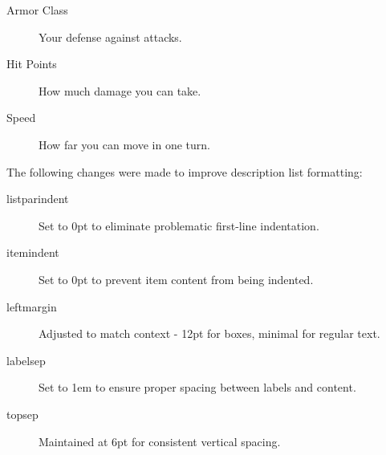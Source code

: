 \documentclass[letterpaper,twocolumn]{dndbook}
\begin{document}
\begin{description}
  \item[Armor Class] Your defense against attacks.
  \item[Hit Points] How much damage you can take.
  \item[Speed] How far you can move in one turn.
\end{description}

The following changes were made to improve description list formatting:

\begin{description}
  \item[listparindent] Set to 0pt to eliminate problematic first-line indentation.
  \item[itemindent] Set to 0pt to prevent item content from being indented.
  \item[leftmargin] Adjusted to match context - 12pt for boxes, minimal for regular text.
  \item[labelsep] Set to 1em to ensure proper spacing between labels and content.
  \item[topsep] Maintained at 6pt for consistent vertical spacing.
\end{description}
\end{document}

